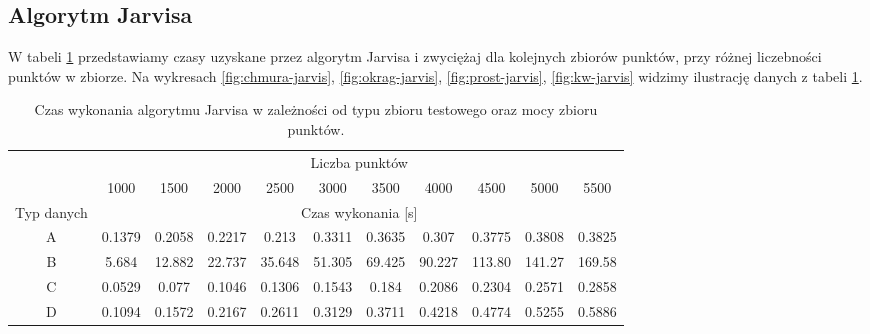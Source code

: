 \documentclass[11pt]{article}
\theoremstyle{remark} \newtheorem{definition}{def.}
\theoremstyle{definition} \newtheorem{twierdzenie}{tw.}
\begin{document}
\subsection{Algorytm Jarvisa}

W tabeli \ref{tab:jarvis} przedstawiamy czasy uzyskane przez algorytm Jarvisa i zwyciężaj dla kolejnych zbiorów punktów, przy różnej liczebności punktów w zbiorze. Na wykresach \ref{fig:chmura-jarvis}, 
\ref{fig:okrag-jarvis}, \ref{fig:prost-jarvis}, \ref{fig:kw-jarvis} widzimy ilustrację danych z tabeli \ref{tab:jarvis}.

\begin{table}[]
\centering
\caption{Czas wykonania algorytmu Jarvisa w zależności od typu zbioru testowego oraz mocy zbioru punktów.}
\label{tab:jarvis}
\begin{tabular}{c|c|c|c|c|c|c|c|c|c|c|}
\cline{2-11}
\multicolumn{1}{l|}{} & \multicolumn{10}{c|}{Liczba punktów} \\ \cline{2-11} 
\multicolumn{1}{l|}{} & 1000 & 1500 & 2000 & 2500 & 3000 & 3500 & 4000 & 4500 & 5000 & 5500 \\ \hline
\multicolumn{1}{|c|}{Typ danych} & \multicolumn{10}{c|}{Czas wykonania {[}s{]}} \\ \hline
\multicolumn{1}{|c|}{A} & 0.1379 & 0.2058 & 0.2217 & 0.213 & 0.3311 & 0.3635 & 0.307 & 0.3775 & 0.3808 & 0.3825 \\ \hline
\multicolumn{1}{|c|}{B} & 5.684 & 12.882 & 22.737 & 35.648 & 51.305 & 69.425 & 90.227 & 113.80 & 141.27 & 169.58 \\ \hline
\multicolumn{1}{|c|}{C} & 0.0529 & 0.077 & 0.1046 & 0.1306 & 0.1543 & 0.184 & 0.2086 & 0.2304 & 0.2571 & 0.2858 \\ \hline
\multicolumn{1}{|c|}{D} & 0.1094 & 0.1572 & 0.2167 & 0.2611 & 0.3129 & 0.3711 & 0.4218 & 0.4774 & 0.5255 & 0.5886 \\ \hline
\end{tabular}
\end{table}
\end{document}
